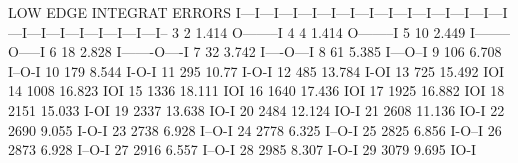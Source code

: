 \begin{Listing}
  LOW EDGE  INTEGRAT   ERRORS  I---I---I---I---I---I---I---I---I---I---I---I---I---I---I---I---I---I---I---I---I---I---I--
     3         2         1.414 O--------I
     4         4         1.414 O--------I
     5        10         2.449           I--------O-----I
     6        18         2.828                 I-------O----I
     7        32         3.742                             I----O---I
     8        61         5.385                                           I---O--I
     9       106         6.708                                                    I--O-I
    10       179         8.544                                                             I-O-I
    11       295        10.77                                                                      I-O-I
    12       485        13.784                                                                              I-OI
    13       725        15.492                                                                                   IOI
    14      1008        16.823                                                                                      IOI
    15      1336        18.111                                                                                        IOI
    16      1640        17.436                                                                                       IOI
    17      1925        16.882                                                                                      IOI
    18      2151        15.033                                                                                 I-OI
    19      2337        13.638                                                                              IO-I
    20      2484        12.124                                                                          IO-I
    21      2608        11.136                                                                       IO-I
    22      2690         9.055                                                               I-O-I
    23      2738         6.928                                                     I--O-I
    24      2778         6.325                                                  I--O-I
    25      2825         6.856                                                     I-O--I
    26      2873         6.928                                                     I--O-I
    27      2916         6.557                                                   I--O-I
    28      2985         8.307                                                            I-O-I
    29      3079         9.695                                                                  IO-I

\end{Listing}
